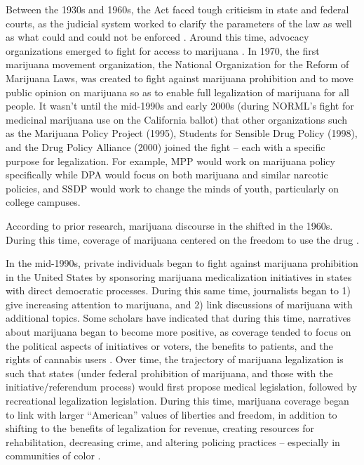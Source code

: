 Between the 1930s and 1960s, the Act faced tough criticism in state and federal courts, as the judicial system worked to clarify the parameters of the law as well as what could and could not be enforced \citep{bonnie_and_whitebread_1970,mosher_and_akins_2019}. Around this time, advocacy organizations emerged to fight for access to marijuana \citep{newhart_and_dolphin_2018}. In 1970, the first marijuana movement organization, the National Organization for the Reform of Marijuana Laws, was created to fight against marijuana prohibition and to move public opinion on marijuana so as to enable full legalization of marijuana for all people. It wasn't until the mid-1990s and early 2000s (during NORML's fight for medicinal marijuana use on the California ballot) that other organizations such as the Marijuana Policy Project (1995), Students for Sensible Drug Policy (1998), and the Drug Policy Alliance (2000) joined the fight -- each with a specific purpose for legalization. For example, MPP would work on marijuana policy specifically while DPA would focus on both marijuana and similar narcotic policies, and SSDP would work to change the minds of youth, particularly on college campuses. 

According to prior research, marijuana discourse in the shifted in the 1960s. During this time, coverage of marijuana centered on the freedom to use the drug \citep{mosher_and_akin_2019}. 

In the mid-1990s, private individuals began to fight against marijuana prohibition in the United States by sponsoring marijuana medicalization initiatives in states with direct democratic processes. During this same time, journalists began to 1) give increasing attention to marijuana, and 2) link discussions of marijuana with additional topics. Some scholars have indicated that during this time, narratives about marijuana began to become more positive, as coverage tended to focus on the political aspects of initiatives or voters, the benefits to patients, and the rights of cannabis users \citep{newhart_and_dolphin_2018,mosher_and_akins_2019,bonnie_and_whitebread_1970}. Over time, the trajectory of marijuana legalization is such that states (under federal prohibition of marijuana, and those with the initiative/referendum process) would first propose medical legislation, followed by recreational legalization legislation. During this time, marijuana coverage began to link with larger ``American'' values of liberties and freedom, in addition to shifting to the benefits of legalization for revenue, creating resources for rehabilitation, decreasing crime, and altering policing practices -- especially in communities of color \citep{mosher_and_akins_2019,newhart_and_dolphin_2018}.

